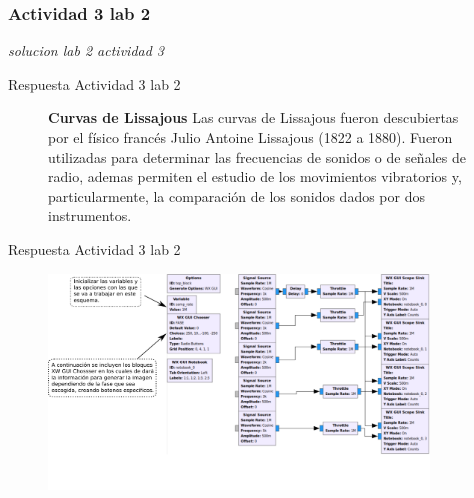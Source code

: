 \subsubsection{Actividad 3 lab 2}
\begin{frame}{}


\begin{block}{}
	\centering
	\vspace{1mm}
	\large{\textit{solucion lab 2 actividad 3}}
	\vspace{1mm}
\end{block}
\end{frame}


\begin{frame}{Respuesta Actividad 3 lab 2}
\begin{figure}[H]
\begin{flushleft}
\textbf{Curvas de Lissajous} Las curvas de Lissajous fueron descubiertas por el físico francés Julio Antoine Lissajous 
(1822 a 1880). Fueron utilizadas para determinar las frecuencias de sonidos o de señales de radio, ademas permiten el 
estudio de los movimientos vibratorios y, particularmente, la comparación de los sonidos dados por dos instrumentos. 
\end{flushleft}
\end{figure}
\end{frame}
\begin{frame}{Respuesta Actividad 3 lab 2}
\begin{figure}[H]
	\vspace{-3mm}
	\centering
	\includegraphics[width=0.9\textwidth]{soluciones/actividad-2-2/pdf/Rlab2_3_1.pdf}
\end{figure}
\end{frame}

